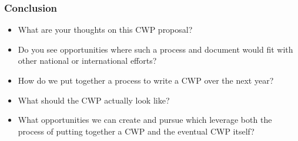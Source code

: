 \begin{frame}
\frametitle{Conclusion}

\begin{itemize}
\item What are your thoughts on this CWP proposal?
\item Do you see opportunities where such a process and document would fit with other national or international efforts?
\item How do we put together a process to write a CWP over the next year?
\item What should the CWP actually look like?
\item What opportunities we can create and pursue which leverage both the process of putting together a CWP and the eventual CWP itself?
\end{itemize}



\end{frame}


